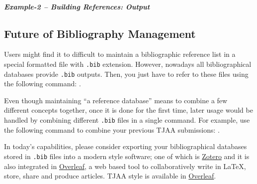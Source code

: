 \documentclass[usenatbib]{tjaa}
\begin{document}
\paragraph*{\itshape Example-2 -- Building References: Output}



\subsection{Future of Bibliography Management}

Users might find it to difficult to maintain a bibliographic reference list in
a special formatted file with \verb|.bib| extension.
However, nowadays all bibliographical databases provide \verb|.bib| outputs.
Then, you just have to refer to these files using the following command:
\verb||.

Even though maintaining ``a reference database'' means to combine a few
different concepts together, once it is done for the first time, later usage
would be handled by combining different \verb|.bib| files in a
single command. For example, use the following command to combine your
previous TJAA submissions:
\verb||.

In today's capabilities, please consider exporting your bibliographical
databases stored in \verb|.bib| files into a modern style software; one of
which is
\href{https://zotero.org/}{Zotero} and it is also integrated in
\href{https://overleaf.com/}{Overleaf}, a web based tool to collaboratively
write in \LaTeX{}, store, share and produce articles.
TJAA style is available in \href{https://overleaf.com/}{Overleaf}.

\label{lastpage}
\end{document}
